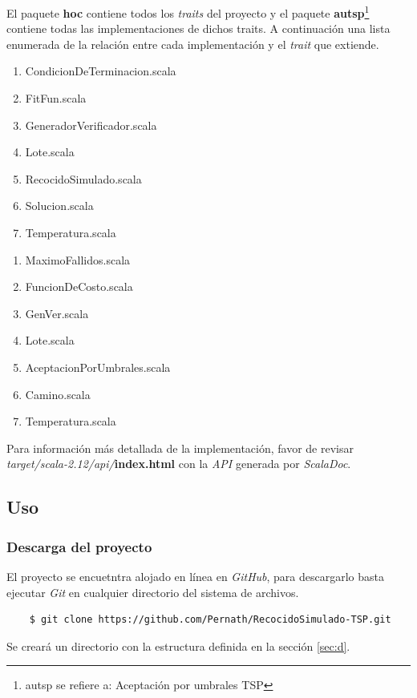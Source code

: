 \documentclass[12pt]{article}
\begin{document}
El paquete \textbf{hoc} contiene todos los \textit{traits} del proyecto
y el paquete \textbf{autsp}\footnote{autsp se refiere a: Aceptación por umbrales TSP} contiene todas las implementaciones de dichos traits.
A continuación una lista enumerada de la relación entre cada implementación y el \textit{trait} que extiende.

\begin{multicols}{2}
\begin{enumerate}
\item CondicionDeTerminacion.scala
\item FitFun.scala
\item GeneradorVerificador.scala
\item Lote.scala
\item RecocidoSimulado.scala
\item Solucion.scala
\item Temperatura.scala
\end{enumerate}

\begin{enumerate}
\item MaximoFallidos.scala
\item FuncionDeCosto.scala
\item GenVer.scala
\item Lote.scala
\item AceptacionPorUmbrales.scala
\item Camino.scala
\item Temperatura.scala
\end{enumerate}
\end{multicols}

Para información más detallada de la implementación, favor de revisar
\textit{target/scala-2.12/api/}\textbf{index.html} con la \textit{API} generada por \textit{ScalaDoc}.


\subsection*{Uso}\label{sec:d}
\subsubsection*{Descarga del proyecto}
El proyecto se encuetntra alojado en línea en \textit{GitHub}, para
descargarlo basta ejecutar \textit{Git} en cualquier directorio del
sistema de archivos.
\begin{verbatim}
    $ git clone https://github.com/Pernath/RecocidoSimulado-TSP.git
\end{verbatim}
Se creará un directorio con la estructura definida en la sección \ref{sec:d}.
\end{document}
